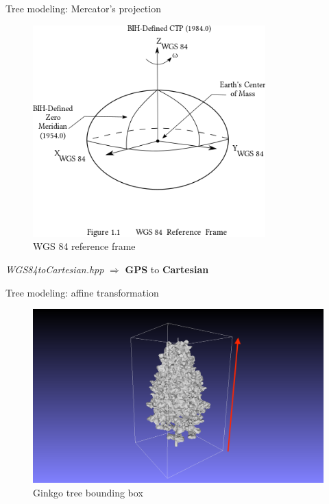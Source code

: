 \documentclass[10pt]{beamer}
\begin{document}
\begin{frame}{Tree modeling: Mercator's projection}
\begin{figure}[H]
\begin{minipage}{0.49\textwidth}
        \includegraphics[width=0.8\textwidth]{images/WGS_84_reference_frame.png}
        \caption{WGS 84 reference frame\cite{mercator-proj}}
    \end{minipage}
\end{figure}

\textit{WGS84toCartesian.hpp} $\Longrightarrow$ \textbf{GPS} to \textbf{Cartesian}
\end{frame}

\begin{frame}{Tree modeling: affine transformation}
  \Large
  \begin{figure}[H]
    \centering
    \includegraphics[width=1\textwidth]{images/ginkgo-bbox.png}
    \caption{Ginkgo tree bounding box}
\end{figure}
\end{frame}
\end{document}
